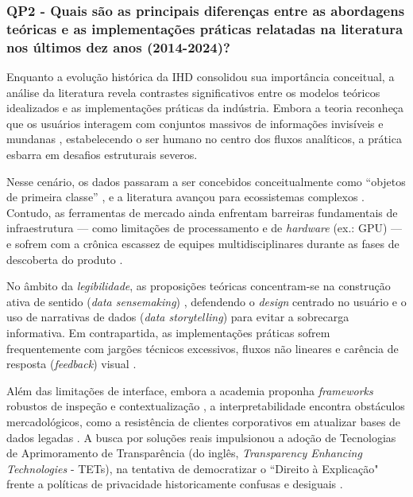 \documentclass[
	12pt,				%
	oneside,			%
	a4paper,			%
	english,			%
	brazil				%
	]{abntex2ppgsi}
\begin{document}
    
    \subsubsection{QP2 - Quais são as principais diferenças entre as abordagens teóricas e as implementações práticas relatadas na literatura nos últimos dez anos (2014-2024)?}

    Enquanto a evolução histórica da IHD consolidou sua importância conceitual, a análise da literatura revela contrastes significativos entre os modelos teóricos idealizados e as implementações práticas da indústria. Embora a teoria reconheça que os usuários interagem com conjuntos massivos de informações invisíveis e mundanas \cite{Parviainen2016}, estabelecendo o ser humano no centro dos fluxos analíticos, a prática esbarra em desafios estruturais severos.
    
    Nesse cenário, os dados passaram a ser concebidos conceitualmente como ``objetos de primeira classe'' \cite{Raj2023}, e a literatura avançou para ecossistemas complexos \cite{bavaresco2019technological}. Contudo, as ferramentas de mercado ainda enfrentam barreiras fundamentais de infraestrutura --- como limitações de processamento e de \textit{hardware} (ex.: GPU) --- e sofrem com a crônica escassez de equipes multidisciplinares durante as fases de descoberta do produto \cite{sailaja2021exploring}.
    
    No âmbito da \emph{legibilidade}, as proposições teóricas concentram-se na construção ativa de sentido (\textit{data sensemaking}) \cite{capeleti2023heuristic, Yuan20243615}, defendendo o \textit{design} centrado no usuário e o uso de narrativas de dados (\textit{data storytelling}) para evitar a sobrecarga informativa. Em contrapartida, as implementações práticas sofrem frequentemente com jargões técnicos excessivos, fluxos não lineares e carência de resposta (\textit{feedback}) visual \cite{sailaja2021exploring}.
    
    Além das limitações de interface, embora a academia proponha \textit{frameworks} robustos de inspeção e contextualização \cite{Koesten2021}, a interpretabilidade encontra obstáculos mercadológicos, como a resistência de clientes corporativos em atualizar bases de dados legadas \cite{sailaja2021exploring}. A busca por soluções reais impulsionou a adoção de Tecnologias de Aprimoramento de Transparência (do inglês, \textit{Transparency Enhancing Technologies} - TETs), na tentativa de democratizar o ``Direito à Explicação" frente a políticas de privacidade historicamente confusas e desiguais \cite{malgieri2020vulnerable, ferreira2024connecting, DeKreij2024}.
    
\end{document}
